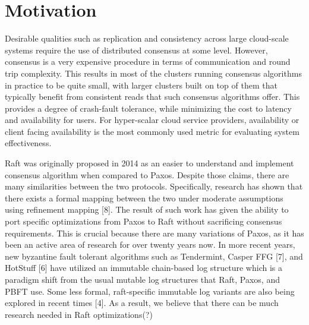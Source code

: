 \section{Motivation}

Desirable qualities such as replication and consistency across large cloud-scale systems require the use of distributed consensus at some level. 
However, consensus is a very expensive procedure in terms of communication and round trip complexity. 
This results in most of the clusters running consensus algorithms in practice to be quite small, with larger clusters built on top of them that typically benefit from consistent reads that such consensus algorithms offer. 
This provides a degree of crash-fault tolerance, while minimizing the cost to latency and availability for users. 
For hyper-scalar cloud service providers, availability or client facing availability is the most commonly used metric for evaluating system effectiveness.

Raft was originally proposed in 2014 as an easier to understand and implement consensus algorithm when compared to Paxos.
 Despite those claims,  there are many similarities between the two protocols.
 Specifically, research has shown that there exists a formal mapping between the two under moderate assumptions using refinement mapping [8].
 The result of such work has given the ability to port specific optimizations from Paxos to Raft without sacrificing consensus requirements.
 This is crucial because there are many variations of Paxos, as it has been an active area of research for over twenty years now.
 In more recent years, new byzantine fault tolerant algorithms such as Tendermint, Casper FFG [7], and HotStuff [6] have utilized an immutable chain-based log structure which is a paradigm shift from the usual mutable log structures that Raft, Paxos, and PBFT use.
 Some less formal, raft-specific immutable log variants are also being explored in recent times [4].
  As a result, we believe that there can be much research needed in Raft optimizations(?)
